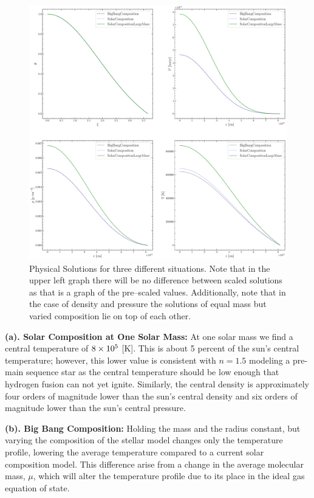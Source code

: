 \begin{figure}
    \centering
    \includegraphics[width=\textwidth]{Graphics/AllCompositions.pdf}
    \caption{Physical Solutions for three different situations. Note that in the upper left graph there will be no difference between scaled solutions as that is a graph of the pre--scaled values. Additionally, note that in the case of density and pressure the solutions of equal mass but varied composition lie on top of each other.}
    \label{fig:physical}
\end{figure}

\textbf{(a). Solar Composition at One Solar Mass:} At one solar mass we find a central temperature of $8\times10^{5}$ [K]. This is about 5 percent of the sun's central temperature; however, this lower value is consistent with $n=1.5$ modeling a pre-main sequence star as the central temperature should be low enough that hydrogen fusion can not yet ignite. Similarly, the central density is approximately four orders of magnitude lower than the sun's central density and six orders of magnitude lower than the sun's central pressure.

\textbf{(b). Big Bang Composition:} Holding the mass and the radius constant, but varying the composition of the stellar model changes only the temperature profile, lowering the average temperature compared to a current solar composition model. This difference arise from a change in the average molecular mass, $\mu$, which will alter the temperature profile due to its place in the ideal gas equation of state.

